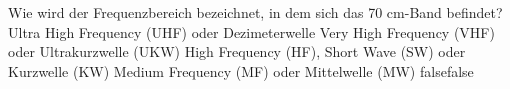     {Wie wird der Frequenzbereich bezeichnet, in dem sich das 70 cm-Band befindet?}
    {Ultra High Frequency (UHF) oder Dezimeterwelle}
    {Very High Frequency (VHF) oder Ultrakurzwelle (UKW)}
    {High Frequency (HF), Short Wave (SW) oder Kurzwelle (KW)}
    {Medium Frequency (MF) oder Mittelwelle (MW)}
    {false}{false}